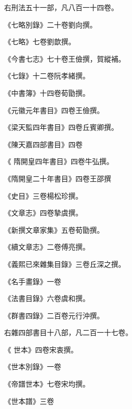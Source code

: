 \begin{pinyinscope}
 右刑法五十一部，凡八百一十四卷。



 《七略別錄》二十卷劉向撰。



 《七略》七卷劉歆撰。



 《今書七志》七十卷王儉撰，賀縱補。



 《七錄》十二卷阮孝緒撰。



 《中書簿》十四卷荀勖撰。



 《元徽元年書目》四卷王儉撰。



 《梁天監四年書目》四卷丘賓卿撰。



 《陳天嘉四部書目》四卷



 《
 隋開皇四年書目》四卷牛弘撰。



 《隋開皇二十年書目》四卷王邵撰



 《史目》三卷楊松珍撰。



 《文章志》四卷摯虞撰。



 《新撰文章家集》五卷荀勖撰。



 《續文章志》二卷傅亮撰。



 《義熙已來雜集目錄》三卷丘深之撰。



 《名手畫錄》一卷



 《法書目錄》六卷虞和撰。



 《群書四錄》二百卷元行沖撰。



 右雜四部書目十八部，凡二百一十七卷。



 《
 世本》四卷宋衷撰。



 《世本別錄》一卷



 《帝譜世本》七卷宋均撰。



 《世本譜》三卷




\end{pinyinscope}
